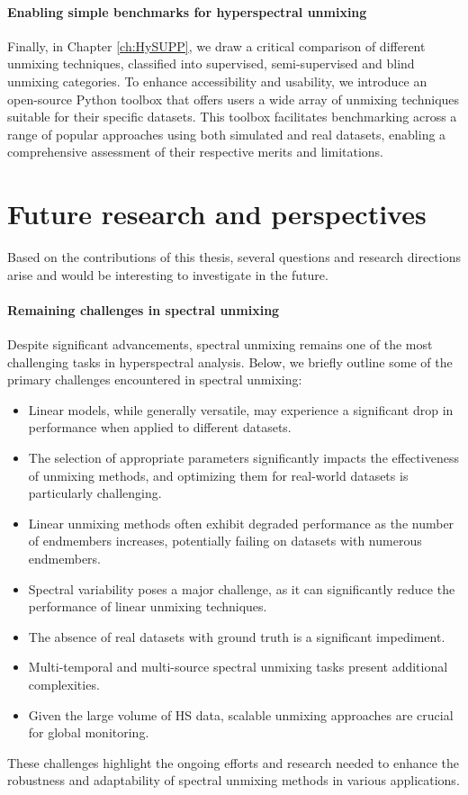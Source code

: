\paragraph{Enabling simple benchmarks for hyperspectral unmixing}
Finally, in Chapter \ref{ch:HySUPP}, we draw a critical comparison of different unmixing techniques, classified into supervised, semi-supervised and blind unmixing categories.
To enhance accessibility and usability, we introduce an open-source Python toolbox that offers users a wide array of unmixing techniques suitable for their specific datasets.
This toolbox facilitates benchmarking across a range of popular approaches using both simulated and real datasets, enabling a comprehensive assessment of their respective merits and limitations.


\section{Future research and perspectives}

Based on the contributions of this thesis, several questions and research directions arise and would be interesting to investigate in the future.

\paragraph{Remaining challenges in spectral unmixing}

Despite significant advancements, spectral unmixing remains one of the most challenging tasks in hyperspectral analysis.
Below, we briefly outline some of the primary challenges encountered in spectral unmixing:
\begin{itemize}
    \item Linear models, while generally versatile, may experience a significant drop in performance when applied to different datasets.
    \item The selection of appropriate parameters significantly impacts the effectiveness of unmixing methods, and optimizing them for real-world datasets is particularly challenging.
    \item Linear unmixing methods often exhibit degraded performance as the number of endmembers increases, potentially failing on datasets with numerous endmembers.
    \item Spectral variability poses a major challenge, as it can significantly reduce the performance of linear unmixing techniques.
    \item The absence of real datasets with ground truth is a significant impediment.
    \item Multi-temporal and multi-source spectral unmixing tasks present additional complexities.
    \item Given the large volume of HS data, scalable unmixing approaches are crucial for global monitoring.
\end{itemize}

These challenges highlight the ongoing efforts and research needed to enhance the robustness and adaptability of spectral unmixing methods in various applications.